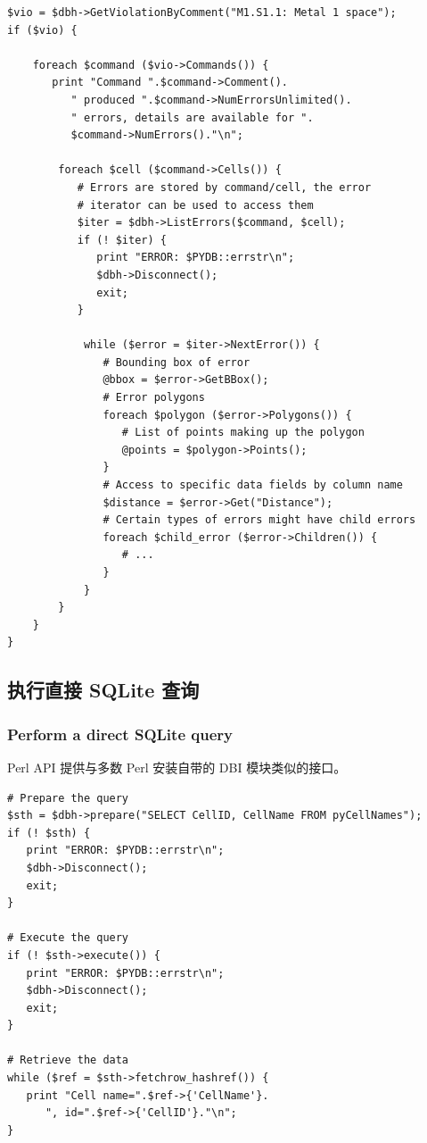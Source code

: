 \begin{lstlisting}
$vio = $dbh->GetViolationByComment("M1.S1.1: Metal 1 space");
if ($vio) {

    foreach $command ($vio->Commands()) {
       print "Command ".$command->Comment().
          " produced ".$command->NumErrorsUnlimited().
          " errors, details are available for ".
          $command->NumErrors()."\n";

        foreach $cell ($command->Cells()) {
           # Errors are stored by command/cell, the error
           # iterator can be used to access them
           $iter = $dbh->ListErrors($command, $cell);
           if (! $iter) {
              print "ERROR: $PYDB::errstr\n";
              $dbh->Disconnect();
              exit;
           }

            while ($error = $iter->NextError()) {
               # Bounding box of error
               @bbox = $error->GetBBox();
               # Error polygons
               foreach $polygon ($error->Polygons()) {
                  # List of points making up the polygon
                  @points = $polygon->Points();
               }
               # Access to specific data fields by column name
               $distance = $error->Get("Distance");
               # Certain types of errors might have child errors
               foreach $child_error ($error->Children()) {
                  # ...
               }
            }
        }
    }
}
\end{lstlisting}

\subsection{执行直接 SQLite 查询}
\subsubsection*{Perform a direct SQLite query}

Perl API 提供与多数 Perl 安装自带的 DBI 模块类似的接口。

\begin{lstlisting}
# Prepare the query
$sth = $dbh->prepare("SELECT CellID, CellName FROM pyCellNames");
if (! $sth) {
   print "ERROR: $PYDB::errstr\n";
   $dbh->Disconnect();
   exit;
}

# Execute the query
if (! $sth->execute()) {
   print "ERROR: $PYDB::errstr\n";
   $dbh->Disconnect();
   exit;
}

# Retrieve the data
while ($ref = $sth->fetchrow_hashref()) {
   print "Cell name=".$ref->{'CellName'}.
      ", id=".$ref->{'CellID'}."\n";
}
\end{lstlisting}

